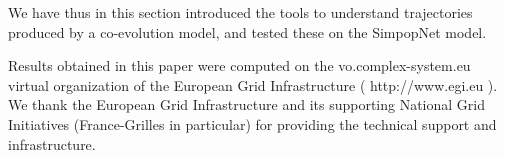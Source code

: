 We have thus in this section introduced the tools to understand trajectories produced by a co-evolution model, and tested these on the SimpopNet model.






%
\begin{acknowledgement}
Results obtained in this paper were computed on the vo.complex-system.eu virtual organization of the European Grid Infrastructure ( http://www.egi.eu ). We thank the European Grid Infrastructure and its supporting National Grid Initiatives (France-Grilles in particular) for providing the technical support and infrastructure.
\end{acknowledgement}


%
%




%

